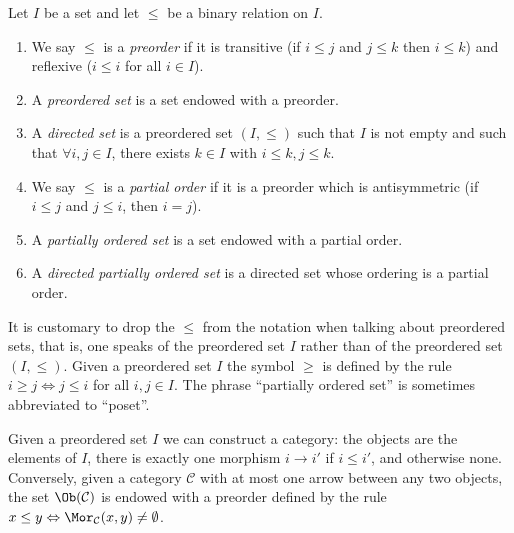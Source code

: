 \begin{definition}
\label{definition-directed-set}
Let $I$ be a set and let $\leq$ be a binary relation on $I$.
\begin{enumerate}
\item We say $\leq$ is a {\it preorder} if it is
transitive (if $i \leq j$ and $j \leq k$ then $i \leq k$) and
reflexive ($i \leq i$ for all $i \in I$).
\item A {\it preordered set} is a set endowed with a preorder.
\item A {\it directed set} is a preordered set $(I, \leq)$
such that $I$ is not empty and such that $\forall i, j \in I$,
there exists $k \in I$ with $i \leq k, j \leq k$.
\item We say $\leq$ is a {\it partial order} if it is a preorder
which is antisymmetric (if $i \leq j$ and $j \leq i$, then $i = j$).
\item A {\it partially ordered set} is a set endowed with a partial order.
\item A {\it directed partially ordered set} is a directed set
whose ordering is a partial order.
\end{enumerate}
\end{definition}

\noindent
It is customary to drop the $\leq$ from the notation when talking
about preordered sets, that is, one speaks of
the preordered set $I$ rather than of the preordered set $(I, \leq)$.
Given a preordered set $I$ the symbol $\geq$ is defined by
the rule $i \geq j \Leftrightarrow j \leq i$ for all $i, j \in I$.
The phrase ``partially ordered set'' is sometimes abbreviated to ``poset''.

\medskip\noindent
Given a preordered set $I$ we can construct a category: the objects are
the elements of $I$, there is exactly one morphism $i \to i'$
if $i \leq i'$, and otherwise none. Conversely, given a category $\mathcal{C}$
with at most one arrow between any two objects, the set
$\Ob(\mathcal{C})$ is endowed with a preorder defined by the rule
$x \leq y \Leftrightarrow \Mor_\mathcal{C}(x, y) \not = \emptyset$.

